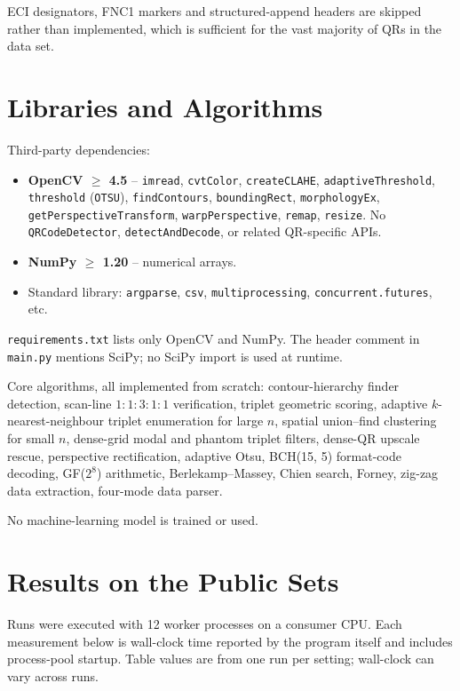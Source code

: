\documentclass[11pt,a4paper]{article}
\begin{document}
ECI designators, FNC1 markers and structured-append headers are
skipped rather than implemented, which is sufficient for the vast
majority of QRs in the data set.

\section{Libraries and Algorithms}

Third-party dependencies:

\begin{itemize}[leftmargin=1.4em, itemsep=0.15em]
  \item \textbf{OpenCV $\ge$ 4.5} -- \texttt{imread},
        \texttt{cvtColor}, \texttt{createCLAHE},
        \texttt{adaptiveThreshold}, \texttt{threshold}
        (\texttt{OTSU}), \texttt{findContours},
        \texttt{boundingRect}, \texttt{morphologyEx},
        \texttt{getPerspectiveTransform},
        \texttt{warpPerspective}, \texttt{remap},
        \texttt{resize}. No \texttt{QRCodeDetector},
        \texttt{detectAndDecode}, or related QR-specific APIs.
  \item \textbf{NumPy $\ge$ 1.20} -- numerical arrays.
  \item Standard library: \texttt{argparse}, \texttt{csv},
        \texttt{multiprocessing}, \texttt{concurrent.futures}, etc.
\end{itemize}

\noindent
\texttt{requirements.txt} lists only OpenCV and NumPy. The header comment in
\texttt{main.py} mentions SciPy; no SciPy import is used at runtime.

Core algorithms, all implemented from scratch:
contour-hierarchy finder detection,
scan-line $1{:}1{:}3{:}1{:}1$ verification,
triplet geometric scoring,
adaptive $k$-nearest-neighbour triplet enumeration for large $n$,
spatial union--find clustering for small $n$,
dense-grid modal and phantom triplet filters,
dense-QR upscale rescue,
perspective rectification,
adaptive Otsu,
BCH(15, 5) format-code decoding,
GF($2^8$) arithmetic,
Berlekamp--Massey, Chien search, Forney,
zig-zag data extraction, four-mode data parser.

No machine-learning model is trained or used.

\section{Results on the Public Sets}

Runs were executed with 12 worker processes on a consumer CPU. Each
measurement below is wall-clock time reported by the program itself
and includes process-pool startup. Table values are from one run per
setting; wall-clock can vary across runs.
\end{document}
